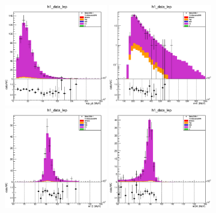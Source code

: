 

\begin{figure}[htp]
\centering
\includegraphics[width=0.4\textwidth]{figures/ZZ_CR/ZZ_CR_lep_pt.eps}
\includegraphics[width=0.4\textwidth]{figures/ZZ_CR/ZZ_CR_m4l.eps}
\includegraphics[width=0.4\textwidth]{figures/ZZ_CR/ZZ_CR_m12.eps}
\includegraphics[width=0.4\textwidth]{figures/ZZ_CR/ZZ_CR_m34.eps}


\end{figure}
